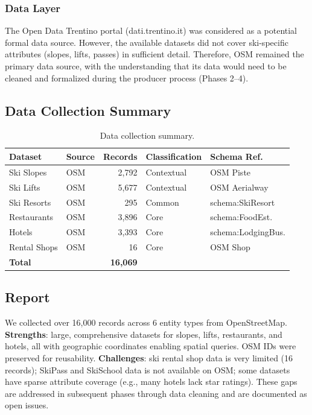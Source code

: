 \subsubsection{Data Layer}

The Open Data Trentino portal (dati.trentino.it) was considered as a potential formal data source. However, the available datasets did not cover ski-specific attributes (slopes, lifts, passes) in sufficient detail. Therefore, OSM remained the primary data source, with the understanding that its data would need to be cleaned and formalized during the producer process (Phases 2--4).

\subsection{Data Collection Summary}

\begin{table}[h!]
\centering
\begin{tabular}{|l|l|r|l|l|}
\hline
\textbf{Dataset} & \textbf{Source} & \textbf{Records} & \textbf{Classification} & \textbf{Schema Ref.} \\
\hline
Ski Slopes & OSM & 2,792 & Contextual & OSM Piste \\
Ski Lifts & OSM & 5,677 & Contextual & OSM Aerialway \\
Ski Resorts & OSM & 295 & Common & schema:SkiResort \\
Restaurants & OSM & 3,896 & Core & schema:FoodEst. \\
Hotels & OSM & 3,393 & Core & schema:LodgingBus. \\
Rental Shops & OSM & 16 & Core & OSM Shop \\
\hline
\textbf{Total} & & \textbf{16,069} & & \\
\hline
\end{tabular}
\caption{Data collection summary.}
\end{table}

\subsection{Report}

We collected over 16,000 records across 6 entity types from OpenStreetMap. \textbf{Strengths}: large, comprehensive datasets for slopes, lifts, restaurants, and hotels, all with geographic coordinates enabling spatial queries. OSM IDs were preserved for reusability. \textbf{Challenges}: ski rental shop data is very limited (16 records); SkiPass and SkiSchool data is not available on OSM; some datasets have sparse attribute coverage (e.g., many hotels lack star ratings). These gaps are addressed in subsequent phases through data cleaning and are documented as open issues.
